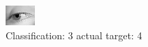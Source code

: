\begin{figure}[h!]
\begin{center}
\includegraphics[width=0.60\columnwidth]{figures/ID2942_class_3_target_4.png}
\end{center}
\caption{ Classification: 3 actual target: 4}
\label{fig:ID2942_class_3_target_4}
\end{figure}
